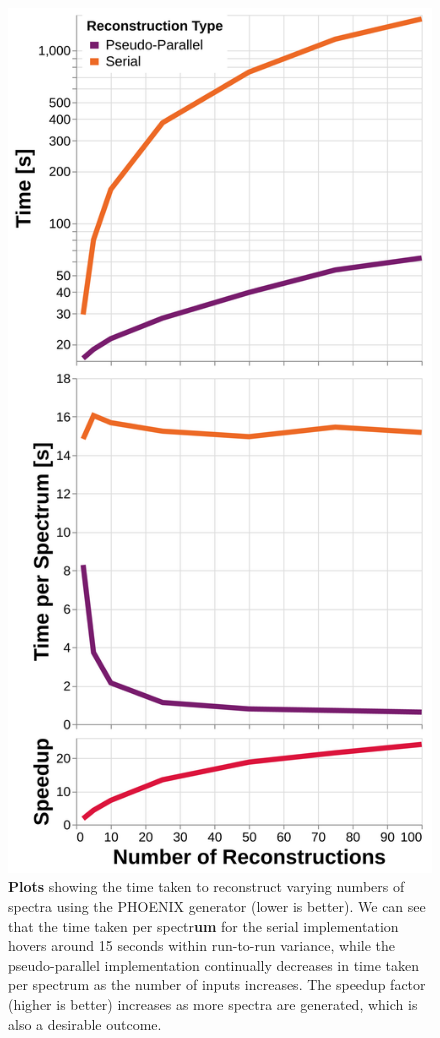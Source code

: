 \documentclass[twocolumn, linenumbers]{aastex631}
\begin{document}
\begin{figure}[t!]
    \centering
    \includegraphics[width=\columnwidth]{figure7}
    \caption{\textbf{Plots} showing the time taken to reconstruct varying numbers of spectra using the PHOENIX generator (lower is better).
    We can see that the time taken per spectr\textbf{um} for the serial implementation hovers around 15 seconds within run-to-run variance, while the pseudo-parallel implementation continually decreases in time taken per spectrum as the number of inputs increases.
    The speedup factor (higher is better) increases as more spectra are generated, which is also a desirable outcome.}
    \label{fig:figure7}
\end{figure}
\end{document}
